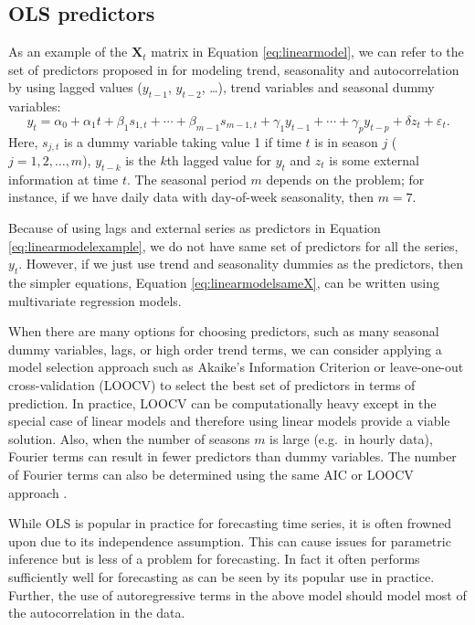 \documentclass[11pt,a4paper,]{article}
\begin{document}
\hypertarget{ols-predictors}{%
\subsection{OLS predictors}\label{ols-predictors}}

As an example of the \(\bm{X}_t\) matrix in Equation \eqref{eq:linearmodel}, we can refer to the set of predictors proposed in \textcite{ashouri2018} for modeling trend, seasonality and autocorrelation by using lagged values (\(y_{t-1}\), \(y_{t-2}\), \dots), trend variables and seasonal dummy variables:
\begin{equation}\label{eq:linearmodelexample}
   y_t = \alpha_0 + \alpha_1 t + \beta_1 s_{1,t} + \cdots + \beta_{m-1} s_{m-1,t} + \gamma_1 y_{t-1} + \cdots + \gamma_p y_{t-p} + \delta z_t + \varepsilon_t.
\end{equation}
Here, \(s_{j,t}\) is a dummy variable taking value 1 if time \(t\) is in season \(j\) (\(j=1, 2, \dots, m\)), \(y_{t-k}\) is the \(k\)th lagged value for \(y_t\) and \(z_t\) is some external information at time \(t\). The seasonal period \(m\) depends on the problem; for instance, if we have daily data with day-of-week seasonality, then \(m=7\).

Because of using lags and external series as predictors in Equation \eqref{eq:linearmodelexample}, we do not have same set of predictors for all the series, \(y_t\). However, if we just use trend and seasonality dummies as the predictors, then the simpler equations, Equation \eqref{eq:linearmodelsameX}, can be written using multivariate regression models.

When there are many options for choosing predictors, such as many seasonal dummy variables, lags, or high order trend terms, we can consider applying a model selection approach such as Akaike's Information Criterion or leave-one-out cross-validation (LOOCV) to select the best set of predictors in terms of prediction. In practice, LOOCV can be computationally heavy except in the special case of linear models \autocite{christensenplane} and therefore using linear models provide a viable solution. Also, when the number of seasons \(m\) is large (e.g.~in hourly data), Fourier terms can result in fewer predictors than dummy variables. The number of Fourier terms can also be determined using the same AIC or LOOCV approach \autocite{fpp2}.

While OLS is popular in practice for forecasting time series, it is often frowned upon due to its independence assumption. This can cause issues for parametric inference but is less of a problem for forecasting. In fact it often performs sufficiently well for forecasting as can be seen by its popular use in practice. Further, the use of autoregressive terms in the above model should model most of the autocorrelation in the data.
\end{document}
